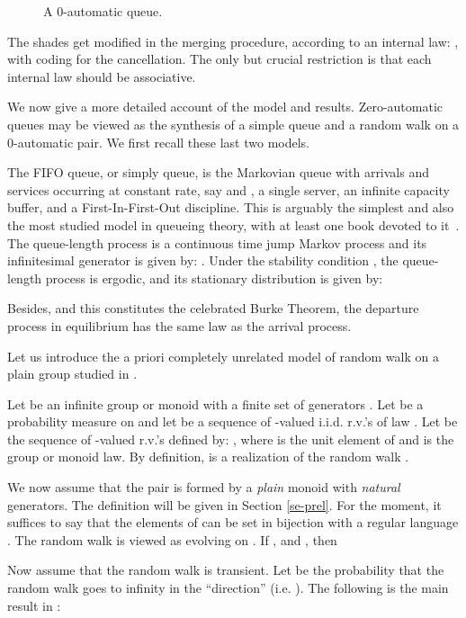 \documentclass[11pt,a4paper]{article}
\theoremstyle{remark}
\begin{document}
\begin{figure}[ht]

\caption{A 0-automatic queue.}
\label{fi-0aut}
\end{figure}

The shades get modified in the merging procedure, according
to an internal law: , with  coding for the cancellation.
The only but crucial restriction is that each internal law should
be associative.

\medskip

We now give a more detailed account of the model and
results. Zero-automatic queues may be viewed as the synthesis of a
simple queue and a random walk on a 0-automatic pair. We first
recall these last two models.

The  FIFO queue, or simply  queue, is the
Markovian queue with arrivals and services occurring at constant
rate, say  and , a single server, an infinite
capacity buffer, and a First-In-First-Out discipline. This is
arguably the simplest and also the most studied model in queueing
theory, with at least one book devoted to it~\cite{cohe82}. The
queue-length process is a continuous time jump Markov process and
its infinitesimal generator  is given by: . Under the stability condition
, the queue-length process is ergodic, and its
stationary distribution  is given by:

Besides, and this constitutes the celebrated Burke Theorem, the
departure process in equilibrium has the same law as the arrival
process.


\medskip

Let us introduce the a priori completely unrelated model of random
walk on a plain group studied in \cite{mair04,MaMa}.

Let  be an infinite group or monoid with a finite set of
generators . Let  be a probability measure on 
and let  be a sequence of -valued i.i.d. r.v.'s of law .
Let  be the sequence of -valued r.v.'s defined by:
,
where  is the unit element of  and  is the group or
monoid law. By definition,  is a realization of the
random walk .

We now assume that the pair  is formed by a {\em plain} monoid
with {\em natural} generators. The
definition will be given in Section \ref{se-prel}. For the
moment, it suffices to say that the  elements of  can be set in
bijection with a regular language .
The random walk  is viewed as evolving on .
If , and , then

Now assume that the random walk is transient. Let
 be the probability that the random
walk goes to infinity in the ``direction''  (i.e.
). The following is the main result in
\cite{mair04}:
\end{document}
